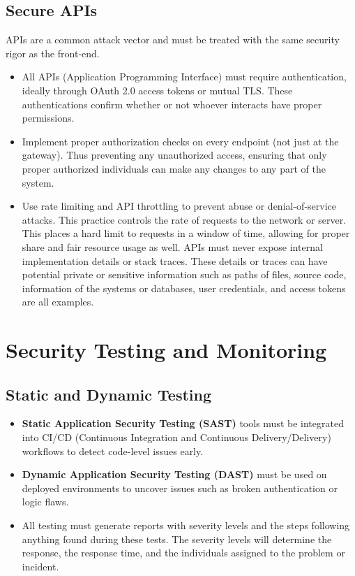 \subsection{Secure APIs}
APIs are a common attack vector and must be treated with the same security rigor as the front-end.
\begin{itemize}
    \item All APIs (Application Programming Interface) must require authentication, ideally through OAuth 2.0 access tokens or mutual TLS. These authentications confirm whether or not whoever interacts have proper permissions.
    \item Implement proper authorization checks on every endpoint (not just at the gateway). Thus preventing any unauthorized access, ensuring that only proper authorized individuals can make any changes to any part of the system.
    \item Use rate limiting and API throttling to prevent abuse or denial-of-service attacks. This practice controls the rate of requests to the network or server. This places a hard limit to requests in a window of time, allowing for proper share and fair resource usage as well.
    \itemPublic APIs must never expose internal implementation details or stack traces. These details or traces can have potential private or sensitive information such as paths of files, source code, information of the systems or databases, user credentials, and access tokens are all examples.
\end{itemize}
\section{Security Testing and Monitoring}
\subsection{Static and Dynamic Testing}
\begin{itemize}
    \item \textbf{Static Application Security Testing (SAST)} tools must be integrated into CI/CD  (Continuous Integration and Continuous Delivery/Delivery) workflows to detect code-level issues early.
    \item \textbf{Dynamic Application Security Testing (DAST)} must be used on deployed environments to uncover issues such as broken authentication or logic flaws.
    \item All testing must generate reports with severity levels and the steps following anything found during these tests. The severity levels will determine the response, the response time, and the individuals assigned to the problem or incident.
\end{itemize}

